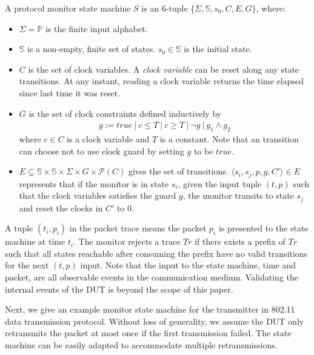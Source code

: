 \begin{definition}
  A protocol monitor state machine $S$ is an 6-tuple $\{\Sigma, \mathbb{S}, s_0, C, E, G\}$, where:
  \begin{itemize}
    \item $\Sigma = \mathbb{P}$ is the finite input alphabet.
    \item $\mathbb{S}$ is a non-empty, finite set of states. $s_0 \in
      \mathbb{S}$ is the initial state.
    \item $C$ is the set of clock variables. A \textit{clock variable} can be
      reset along any state transitions. At any instant, reading a clock
      variable returns the time elapsed since last time it was reset.
    \item $G$ is the set of clock constraints defined inductively by
      \begin{align*}
        g := true\ |\ c \le T\ |\ c \ge T\ |\ \neg g\ |\ g_1 \land g_2
      \end{align*}%
      where $c \in C$ is a clock variable and $T$ is a constant. Note that an
      transition can choose not to use clock guard by setting $g$ to be $true$.
    \item $E \subseteq \mathbb{S} \times \mathbb{S} \times \Sigma \times  G \times \mathscr{P}(C)$
      gives the set of transitions. $\langle s_i, s_j, p, g, C'\rangle \in E$
      represents that if the monitor is in state $s_i$, given the input tuple
      $(t, p)$ such that the clock variables satisfies the guard $g$, the
      monitor transits to state $s_j$ and reset the clocks in $C'$ to 0.
  \end{itemize}
  \label{def:sm}
\end{definition}

A tuple $(t_i, p_i)$ in the packet trace means the packet $p_i$ is presented to
the state machine at time $t_i$.
%
The monitor rejects a trace $Tr$ if there exists a prefix of $Tr$ such that all
states reachable after consuming the prefix have no valid transitions for the
next $(t, p)$ input.
%
Note that the input to the state machine, time and packet, are all
observable events in the communication medium.
%
Validating the internal events of the DUT is beyond the
scope of this paper.

Next, we give an example monitor state machine for the transmitter in 802.11
data transmission protocol.
%
Without loss of generality, we assume the DUT only
retransmits the packet at most once if the first transmission failed.
%
The state machine can be easily adapted to accommodate multiple retransmissions.

